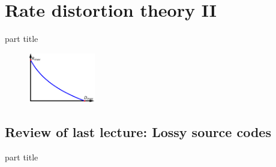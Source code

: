 
\DeclareMathOperator{\cwd}{codeword}
\newtheorem{proposition}{Proposition}
\usepackage{forest}
\usepackage{lipsum}
\usepackage{subcaption}


\section{Rate distortion theory II}

\begin{frame}
 \vspace{8.0ex}
\begin{center}
\begin{beamercolorbox}[sep=16pt,center]{part title}
\insertsection\par
\end{beamercolorbox}
\end{center}
\begin{figure}
\includegraphics[width=0.26\textwidth]{RD_II/RD_Plot_Final.png}
\captionsetup{labelformat=empty}
\end{figure}
\end{frame}




\subsection{Review of last lecture: Lossy source codes}

\begin{frame}
 \vspace{12.0ex}
\begin{center}
\begin{beamercolorbox}[sep=12pt,center]{part title}
\insertsubsection\par
\end{beamercolorbox}
\end{center}
\end{frame}

